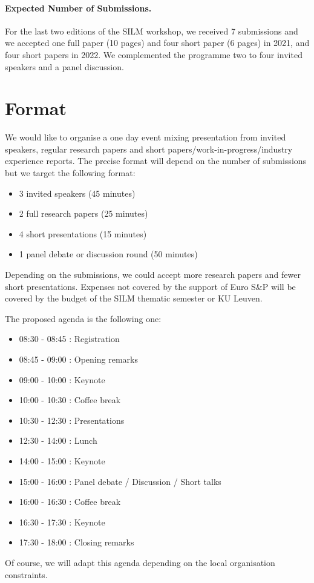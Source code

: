 \documentclass[a4paper,11pt]{article}
\begin{document}
\paragraph{Expected Number of Submissions.}
%
For the last two editions of the SILM workshop, we received 7 submissions
and we accepted one full paper (10 pages) and four short paper (6 pages) in
2021, and four short papers in 2022. We complemented the programme two to
four invited speakers and a panel discussion.


\section{Format}
%
We would like to organise a one day event mixing presentation from invited
speakers, regular research papers and short
papers/work-in-progress/industry experience reports. The precise format
will depend on the number of submissions but we target the following
format:
%
\begin{itemize}
    \item 3 invited speakers (45 minutes)
    \item 2 full research papers (25 minutes)
    \item 4 short presentations (15 minutes)
    \item 1 panel debate or discussion round (50 minutes)
\end{itemize}

Depending on the submissions, we could accept more research papers and
fewer short presentations. Expenses not covered by the support of Euro S\&P
will be covered by the budget of the SILM thematic semester or KU Leuven.

The proposed agenda is the following one:
%
\begin{itemize}
    \item 08:30 - 08:45 : Registration
    \item 08:45 - 09:00 : Opening remarks
    \item 09:00 - 10:00 : Keynote
    \item 10:00 - 10:30 : Coffee break
    \item 10:30 - 12:30 : Presentations
    \item 12:30 - 14:00 : Lunch
    \item 14:00 - 15:00 : Keynote
    \item 15:00 - 16:00 : Panel debate / Discussion / Short talks
    \item 16:00 - 16:30 : Coffee break
    \item 16:30 - 17:30 : Keynote
    \item 17:30 - 18:00 : Closing remarks
\end{itemize}
%
Of course, we will adapt this agenda depending on the local organisation constraints.
\end{document}
